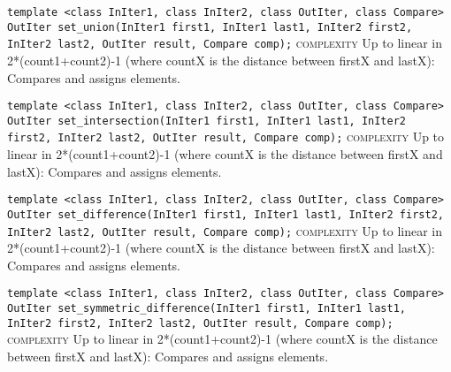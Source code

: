 \noindent{}\hspace*{0.25em}\lstinline[basicstyle=\ttfamily\color{corange}]{template <class InIter1, class InIter2, class OutIter, class Compare> OutIter set_union(InIter1 first1, InIter1 last1, InIter2 first2, InIter2 last2, OutIter result, Compare comp);} \textsc{complexity} Up to linear in 2*(count1+count2)-1 (where countX is the distance between firstX and lastX): Compares and assigns elements.\\\vspace{-0.6em}

\noindent{}\hspace*{0.25em}\lstinline[basicstyle=\ttfamily\color{corange}]{template <class InIter1, class InIter2, class OutIter, class Compare> OutIter set_intersection(InIter1 first1, InIter1 last1, InIter2 first2, InIter2 last2, OutIter result, Compare comp);} \textsc{complexity} Up to linear in 2*(count1+count2)-1 (where countX is the distance between firstX and lastX): Compares and assigns elements.\\\vspace{-0.6em}

\noindent{}\hspace*{0.25em}\lstinline[basicstyle=\ttfamily\color{corange}]{template <class InIter1, class InIter2, class OutIter, class Compare> OutIter set_difference(InIter1 first1, InIter1 last1, InIter2 first2, InIter2 last2, OutIter result, Compare comp);} \textsc{complexity} Up to linear in 2*(count1+count2)-1 (where countX is the distance between firstX and lastX): Compares and assigns elements.\\\vspace{-0.6em}

\noindent{}\hspace*{0.25em}\lstinline[basicstyle=\ttfamily\color{corange}]{template <class InIter1, class InIter2, class OutIter, class Compare> OutIter set_symmetric_difference(InIter1 first1, InIter1 last1, InIter2 first2, InIter2 last2, OutIter result, Compare comp);} \textsc{complexity} Up to linear in 2*(count1+count2)-1 (where countX is the distance between firstX and lastX): Compares and assigns elements.\\\vspace{-0.6em}

